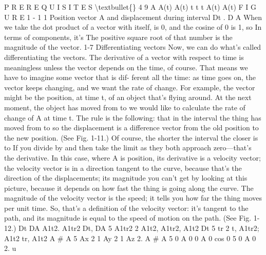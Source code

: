 \documentclass[10pt,oneside]{article}
\begin{document}
P R E R E Q U I S I T E S \textbackslash{}textbullet\{\} 4 9 A  A(t)  A(t) t  t  t A(t) A(t) F I G U R E 1 - 1 1 Position vector A and displacement during interval Dt . D A When we take the dot product of a vector with itself, is 0, and the cosine of 0 is 1, so In terms of components, it’s The positive square root of that number is the magnitude of the vector. 1-7 Differentiating vectors Now, we can do what’s called differentiating the vectors. The derivative of a vector with respect to time is meaningless unless the vector depends on the time, of course. That means we have to imagine some vector that is dif- ferent all the time: as time goes on, the vector keeps changing, and we want the rate of change. For example, the vector might be the position, at time t, of an object that’s flying around. At the next moment, the object has moved from to we would like to calculate the rate of change of A at time t. The rule is the following: that in the interval the thing has moved from to so the displacement is a difference vector from the old position to the new position. (See Fig. 1-11.) Of course, the shorter the interval the closer is to If you divide by and then take the limit as they both approach zero---that’s the derivative. In this case, where A is position, its derivative is a velocity vector; the velocity vector is in a direction tangent to the curve, because that’s the direction of the displacements; its magnitude you can’t get by looking at this picture, because it depends on how fast the thing is going along the curve. The magnitude of the velocity vector is the speed; it tells you how far the thing moves per unit time. So, that’s a definition of the velocity vector: it’s tangent to the path, and its magnitude is equal to the speed of motion on the path. (See Fig. 1-12.) Dt DA A1t2. A1tr2 Dt, DA 5 A1tr2 2 A1t2, A1tr2, A1t2 Dt 5 tr 2 t, A1tr2; A1t2 tr, A1t2 A \# A 5 Ax 2 1 Ay 2 1 Az 2. A \# A 5 0 A 0 0 A 0  cos 0 5 0 A 0 2. u\par
\end{document}
